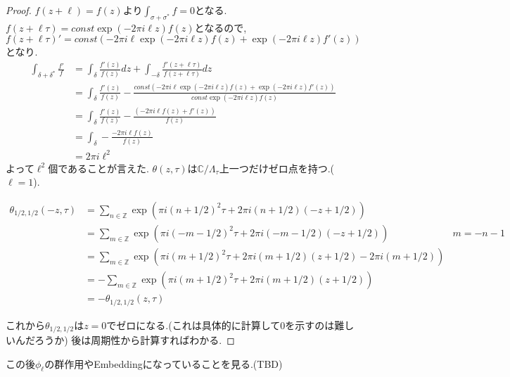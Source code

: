 \documentclass[uplatex,b5j,11pt]{jsbook}
\begin{document}
\begin{proof}

$f(z+ \ell) = f(z)$より$\int_{\sigma  + \sigma^*}f = 0$となる.
$f(z + \ell \tau) = const \exp(-2 \pi i \ell z) f(z)$となるので,$f(z + \ell \tau)' = const ( -2\pi i \ell \exp(-2 \pi i \ell z)f(z) + \exp(-2 \pi i \ell z)f'(z))$となり.
\begin{align*}
   \int_{\delta  + \delta^*}\frac{f'}{f}& = \int_{\delta} \frac{f'(z)}{f(z)}dz + \int_{- \delta} \frac{f'(z+ \ell \tau)}{f(z + \ell \tau)}dz \\
                                                & = \int_{\delta} \frac{f'(z)}{f(z)} - \frac{ const ( -2\pi i \ell \exp(-2 \pi i \ell z)f(z) + \exp(-2 \pi i \ell z)f'(z))}{ const \exp(-2 \pi i \ell z) f(z)} \\
                                                & = \int_{\delta} \frac{f'(z)}{f(z)} - \frac{ ( -2\pi i \ell f(z) + f'(z))}{ f(z)} \\
                                                & = \int_{\delta}  - \frac{  -2\pi i \ell f(z) }{ f(z)} \\
                                                & = 2 \pi i \ell^2
\end{align*}
よって$\ell^2$個であることが言えた.
$\theta(z, \tau)$は$\mathbb{C}/ \Lambda_{\tau}$上一つだけゼロ点を持つ.($\ell = 1$).

\begin{align*}
    \theta_{1/2, 1/2}(-z, \tau) & = \sum_{n \in \mathbb{Z}} \exp \left(\pi i (n+ 1/2)^2\tau + 2 \pi i (n+ 1/2)(-z + 1/2)\right) \\
                                & = \sum_{m \in \mathbb{Z}} \exp \left(\pi i (-m - 1/2)^2\tau + 2 \pi i (-m - 1/2)(-z + 1/2)\right)  & m = -n-1\\
                                & = \sum_{m \in \mathbb{Z}} \exp \left(\pi i (m + 1/2)^2\tau + 2 \pi i (m + 1/2)(z + 1/2)  - 2\pi i (m+1/2)\right)\\
                                & = - \sum_{m \in \mathbb{Z}} \exp \left(\pi i (m + 1/2)^2\tau + 2 \pi i (m + 1/2)(z + 1/2)\right)\\
                                & = - \theta_{1/2, 1/2}(z, \tau)
\end{align*}

これから$\theta_{1/2, 1/2}$は$z=0$でゼロになる.(これは具体的に計算して0を示すのは難しいんだろうか)
後は周期性から計算すればわかる.
\end{proof}
この後$\phi_{\ell}$の群作用やEmbeddingになっていることを見る.(TBD)
\end{document}
